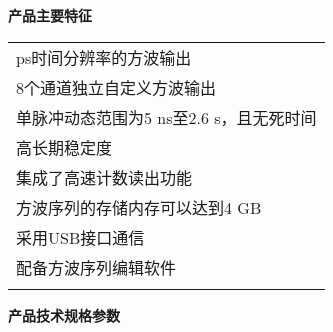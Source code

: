 \makeatletter
\def\hlinewd#1{%
  \noalign{\ifnum0=`}\fi\hrule \@height #1 \futurelet
   \reserved@a\@xhline}
\makeatother
\noindent\sanhao\textbf{产品主要特征}
\vspace{0.3cm}
\song
\begin{table}[H]
{}
\begin{tabular}{m{13.5cm}}
\rowcolor{gray!20}
\arrayrulecolor{tabcolor_top}\toprule[1.8pt]
50 ps时间分辨率的方波输出\\\arrayrulecolor{tabcolor}\midrule[1.2pt]
8个通道独立自定义方波输出 \\\arrayrulecolor{tabcolor}\midrule[1.2pt]
单脉冲动态范围为5 ns至2.6 s，且无死时间\\\arrayrulecolor{tabcolor}\midrule[1.2pt]
高长期稳定度\\\arrayrulecolor{tabcolor}\midrule[1.2pt]
集成了高速计数读出功能\\\arrayrulecolor{tabcolor}\midrule[1.2pt]
方波序列的存储内存可以达到4 GB\\\arrayrulecolor{tabcolor}\midrule[1.2pt]
采用USB接口通信\\\arrayrulecolor{tabcolor}\midrule[1.2pt]
配备方波序列编辑软件\\
\arrayrulecolor{tabcolor_top}\bottomrule[1.8pt]
\end{tabular}
\end{table}


\vspace{0.5cm}
\noindent\sanhao\textbf{产品技术规格参数}
\vspace{0.5cm}

